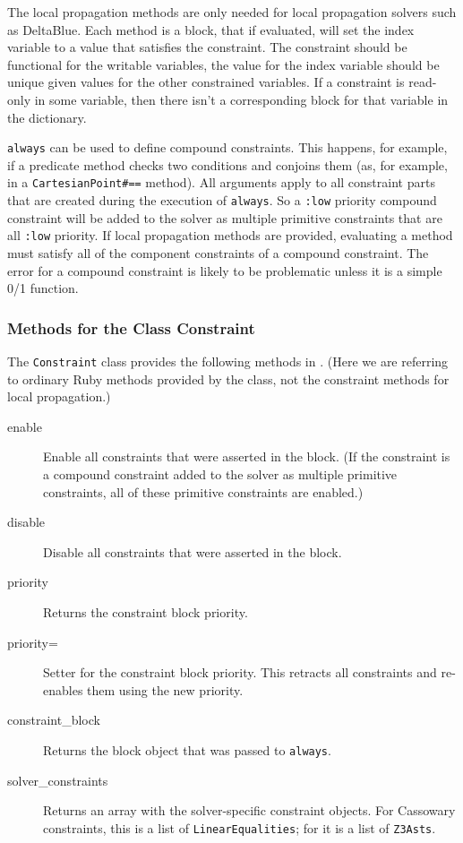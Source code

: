 The local propagation methods are only needed for local propagation
solvers such as DeltaBlue.  Each method is a block, that if evaluated,
will set the index variable to a value that satisfies the constraint.
The constraint should be functional for the writable variables, \ie
the value for the index variable should be unique given values for the
other constrained variables.  If a constraint is read-only in some
variable, then there isn't a corresponding block for that variable in
the dictionary.

\lstinline{always} can be used to define compound constraints. This
happens, for example, if a predicate method checks two conditions and
conjoins them (as, for example, in a \lstinline{CartesianPoint#==}
method).  All arguments apply to all constraint parts that are created
during the execution of \lstinline{always}. So a \lstinline{:low} priority
compound constraint will be added to the solver as multiple primitive
constraints that are all \lstinline{:low} priority.  If local propagation
methods are provided, evaluating a method must satisfy all of the
component constraints of a compound constraint.  The error for a
compound constraint is likely to be problematic unless it is a simple
0/1 function.



\subsubsection{Methods for the Class Constraint}
\label{sec:methods-class-constraint}

The \lstinline{Constraint} class provides the following methods in
\toolname.  (Here we are referring to ordinary Ruby methods provided
by the class, not the constraint methods for local propagation.)

\begin{description}
\item[enable] Enable all constraints that were asserted in the block.
  (If the constraint is a compound constraint added
  to the solver as multiple primitive constraints, all of these
  primitive constraints are enabled.)
\item[disable] Disable all constraints that were asserted in the block.
\item[priority] Returns the constraint block priority.
\item[priority=] Setter for the constraint block priority. This
  retracts all constraints and re-enables them using the new priority.
\item[constraint\_block] Returns the block object that was passed to
  \lstinline{always}.
\item[solver\_constraints] Returns an array with the solver-specific
  constraint objects. For Cassowary constraints, this is a list of
  \lstinline{LinearEqualities}; for \zthree it is a list of
  \lstinline{Z3Asts}.
\end{description}

